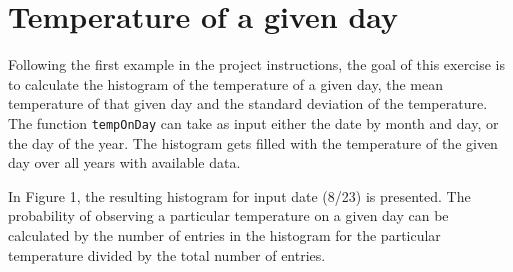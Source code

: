 \section{Temperature of a given day}

Following the first example in the project instructions, the goal of this exercise is to calculate the histogram of the temperature of a given day, the mean temperature of that given day and the standard deviation of the temperature. The function \texttt{tempOnDay} can take as input either the date by month and day, or the day of the year. The histogram gets filled with the temperature of the given day over all years with available data. 

In Figure 1, the resulting histogram for input date (8/23) is presented. The probability of observing a particular temperature on a given day can be calculated by the number of entries in the histogram for the particular temperature divided by the total number of entries.

